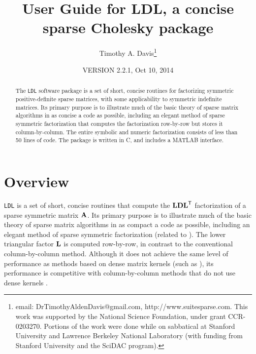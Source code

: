 \documentclass[12pt]{article}
\newcommand{\m}[1]{{\bf{#1}}}       %
\newcommand{\tr}{^{\sf T}}          %
\begin{document}

\title{User Guide for LDL, a concise sparse Cholesky package}
\author{Timothy A. Davis\thanks{
email: DrTimothyAldenDavis@gmail.com,
http://www.suitesparse.com.
This work was supported by the National
Science Foundation, under grant CCR-0203270.
Portions of the work were done while on sabbatical at Stanford University
and Lawrence Berkeley National Laboratory (with funding from Stanford
University and the SciDAC program).
}}

\date{VERSION 2.2.1, Oct 10, 2014}

\maketitle

\begin{abstract}
The {\tt LDL} software package is a set of short, concise routines for
factorizing symmetric positive-definite sparse matrices, with some
applicability to symmetric indefinite matrices.  Its primary purpose is
to illustrate much of the basic theory of sparse matrix algorithms in as
concise a code as possible, including an elegant method
of sparse symmetric factorization that computes the factorization row-by-row
but stores it column-by-column.  The entire symbolic and numeric factorization
consists of less than 50 lines of code.  The package is written in C,
and includes a MATLAB interface.
\end{abstract}

\section{Overview}

{\tt LDL} is a set of short, concise routines that compute the $\m{LDL}\tr$
factorization of a sparse symmetric matrix $\m{A}$.  Its primary purpose is
to illustrate much of the basic theory of sparse matrix algorithms in as
compact a code as possible, including an elegant method of
sparse symmetric factorization (related to \cite{Liu86c,Liu91}).
The lower triangular factor $\m{L}$ is computed row-by-row, in contrast to the
conventional column-by-column method.
Although it does not achieve the same level of performance
as methods based on dense matrix kernels
(such as \cite{NgPeyton93,RothbergGupta91}),
its performance is competitive with column-by-column methods that do not
use dense kernels \cite{GeorgeLiu79, GeorgeLiu, GilbertMolerSchreiber}.
\end{document}
